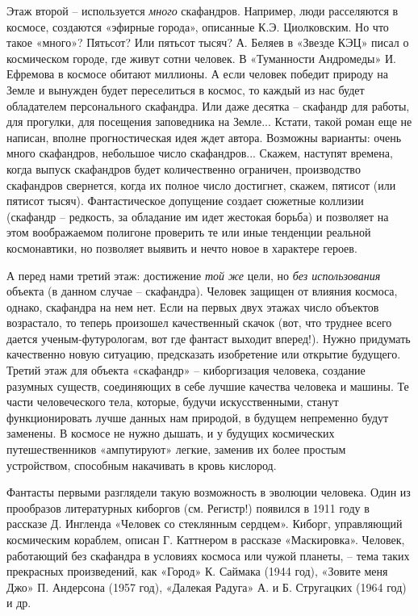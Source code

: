 \documentclass[11pt,a4paper]{article}
\begin{document}
Этаж второй -- используется \emph{много} скафандров. Например, люди
расселяются в космосе, создаются «эфирные города», описанные
К.Э. Циолковским. Но что такое «много»? Пятьсот? Или пятьсот тысяч? А. Беляев
в «Звезде КЭЦ» писал о космическом городе, где живут сотни человек. В
«Туманности Андромеды» И. Ефремова в космосе обитают миллионы. А если человек
победит природу на Земле и вынужден будет переселиться в космос, то каждый из
нас будет обладателем персонального скафандра. Или даже десятка -- скафандр
для работы, для прогулки, для посещения заповедника на Земле... Кстати, такой
роман еще не написан, вполне прогностическая идея ждет автора. Возможны
варианты: очень много скафандров, небольшое число скафандров... Скажем,
наступят времена, когда выпуск скафандров будет количественно ограничен,
производство скафандров свернется, когда их полное число достигнет, скажем,
пятисот (или пятисот тысяч). Фантастическое допущение создает сюжетные
коллизии (скафандр -- редкость, за обладание им идет жестокая борьба) и
позволяет на этом воображаемом полигоне проверить те или иные тенденции
реальной космонавтики, но позволяет выявить и нечто новое в характере героев.

А перед нами третий этаж: достижение \emph{той же} цели, но \emph{без
  использования} объекта (в данном случае -- скафандра). Человек защищен от
влияния космоса, однако, скафандра на нем нет. Если на первых двух этажах
число объектов возрастало, то теперь произошел качественный скачок (вот, что
труднее всего дается ученым-футурологам, вот где фантаст выходит вперед!).
Нужно придумать качественно новую ситуацию, предсказать изобретение или
открытие будущего. Третий этаж для объекта «скафандр» -- киборгизация
человека, создание разумных существ, соединяющих в себе лучшие качества
человека и машины. Те части человеческого тела, которые, будучи
искусственными, станут функционировать лучше данных нам природой, в будущем
непременно будут заменены. В космосе не нужно дышать, и у будущих космических
путешественников «ампутируют» легкие, заменив их более простым устройством,
способным накачивать в кровь кислород.

Фантасты первыми разглядели такую возможность в эволюции человека. Один из
прообразов литературных киборгов (см. Регистр!) появился в 1911 году в
рассказе Д. Ингленда «Человек со стеклянным сердцем». Киборг, управляющий
космическим кораблем, описан Г. Каттнером в рассказе «Маскировка». Человек,
работающий без скафандра в условиях космоса или чужой планеты, -- тема таких
прекрасных произведений, как «Город» К. Саймака (1944 год), «Зовите меня Джо»
П. Андерсона (1957 год), «Далекая Радуга» А. и Б. Стругацких (1964 год) и др.
\end{document}
